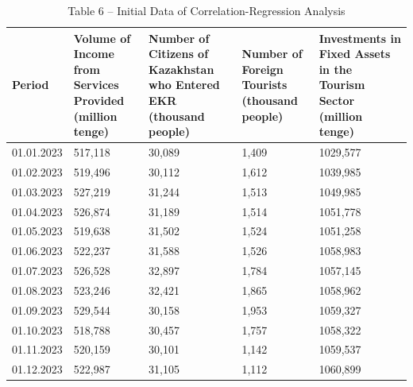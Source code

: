 \begin{table}[H]
\caption*{Table 6 -- Initial Data of Correlation-Regression Analysis}
\centering
\begin{tabular}{|l|p{}|p{}|p{}|p{}|}
\hline
Period &
  Volume of Income from Services Provided (million tenge) &
  Number of Citizens of Kazakhstan who Entered EKR (thousand people) &
  Number of Foreign Tourists (thousand people) &
  Investments in Fixed Assets in the Tourism Sector (million tenge) \\ \hline
01.01.2023 & 517,118 & 30,089 & 1,409 & 1029,577 \\ \hline
01.02.2023 & 519,496 & 30,112 & 1,612 & 1039,985 \\ \hline
01.03.2023 & 527,219 & 31,244 & 1,513 & 1049,985 \\ \hline
01.04.2023 & 526,874 & 31,189 & 1,514 & 1051,778 \\ \hline
01.05.2023 & 519,638 & 31,502 & 1,524 & 1051,258 \\ \hline
01.06.2023 & 522,237 & 31,588 & 1,526 & 1058,983 \\ \hline
01.07.2023 & 526,528 & 32,897 & 1,784 & 1057,145 \\ \hline
01.08.2023 & 523,246 & 32,421 & 1,865 & 1058,962 \\ \hline
01.09.2023 & 529,544 & 30,158 & 1,953 & 1059,327 \\ \hline
01.10.2023 & 518,788 & 30,457 & 1,757 & 1058,322 \\ \hline
01.11.2023 & 520,159 & 30,101 & 1,142 & 1059,537 \\ \hline
01.12.2023 & 522,987 & 31,105 & 1,112 & 1060,899 \\ \hline
\end{tabular}
\end{table}

